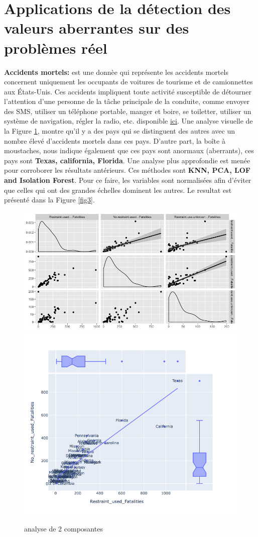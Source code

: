 \section{Applications de la détection des valeurs aberrantes sur des problèmes réel}
\textbf{Accidents mortels:}
 est une donnèe qui représente les accidents mortels concernent uniquement les occupants de voitures de tourisme et de camionnettes aux États-Unis. Ces accidents impliquent toute activité susceptible de détourner l'attention d'une personne de la tâche principale de la conduite, comme envoyer des SMS, utiliser un téléphone portable, manger et boire, se toiletter, utiliser un système de navigation, régler la radio, etc. disponible  \href{https://www.bts.dot.gov/content/passenger-car-and-light-truck-occupants-killed-and-restraint-use}{\underline{ici}}. Une analyse visuelle de la Figure \ref{fig2}, montre qu'il y a des pays qui se distinguent des autres avec un nombre élevé d'accidents mortels dans ces pays. D'autre part, la boîte à moustaches, nous indique également que ces pays sont anormaux (aberrants), ces pays sont \textbf{Texas, california, Florida}. Une analyse plus approfondie est menée pour corroborer les résultats antérieurs. Ces méthodes sont \textbf{ KNN, PCA, LOF and Isolation Forest}. Pour ce faire, les variables sont normalisées afin d’éviter que celles qui ont des grandes échelles dominent les autres. Le resultat est présenté dans la Figure \ref{fig3}. 

 \begin{figure}[ht]
    \centering
    \includegraphics[width=.55\textwidth]{ADOA/Images/Fatal.png}
    \includegraphics[width=.40\textwidth]{ADOA/Images/Fatal1.png}
    \caption{analyse de 2 composantes}%
    \label{fig2}
\end{figure}

